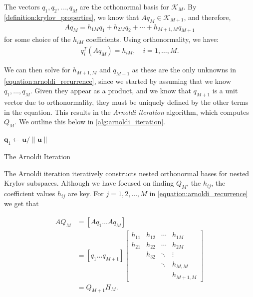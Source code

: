 The vectors $q_1, q_2, \ldots, q_M$ are the orthonormal basis for $\mathcal{K}_M$. By \cref{definition:krylov_properties}, we know that $A q_M \in \mathcal{K}_{M+1}$, and therefore,
\begin{align}
A q_M = h_{1M} q_1 + h_{2M} q_2 + \cdots + h_{M+1,M} q_{M+1}
\label{equation:arnoldi_recurrence}
\end{align}
for some choice of the $h_{iM}$ coefficients. Using orthonormality, we have:
\begin{align}
q_i^T(A q_M) = h_{iM}, \quad i = 1,\ldots,M.
\label{equation:cij_projection}
\end{align}

We can then solve for $h_{M+1,M}$ and $q_{M+1}$ as these are the only unknowns in \cref{equation:arnoldi_recurrence}, since we started by assuming that we know $q_1, \ldots, q_M$. Given they appear as a product, and we know that $q_{M+1}$ is a unit vector due to orthonormality, they must be uniquely defined by the other terms in the equation. This results in the \textit{Arnoldi iteration} algorithm, which computes $Q_M$. We outline this below in \cref{alg:arnoldi_iteration}.

\begin{algorithm}[H]
    \DontPrintSemicolon
    $\mathbf{q}_1 \leftarrow \mathbf{u} / \|\mathbf{u}\|$\; 
    \caption{The Arnoldi Iteration}
    \label{alg:arnoldi_iteration}
\end{algorithm}

The Arnoldi iteration iteratively constructs nested orthonormal bases for nested Krylov subspaces. Although we have focused on finding $Q_M$, the $h_{ij}$, the coefficient values $h_{ij}$ are key. For $j = 1,2,\ldots,M$ in \cref{equation:arnoldi_recurrence} we get that

\begin{align}
AQ_M &= [Aq_1 \ldots Aq_M] \nonumber \\
&= [q_1 \ldots q_{M+1}]
\begin{bmatrix} 
h_{11} & h_{12} & \cdots & h_{1M} \\ 
h_{21} & h_{22} & \cdots & h_{2M} \\ 
       & h_{32} & \ddots & \vdots \\ 
       &        & \ddots & h_{M,M} \\
       &        &        & h_{M+1,M}
\end{bmatrix} \nonumber \\
&= Q_{M+1} H_M.
\label{equation:arnoldi_identity}
\end{align}

